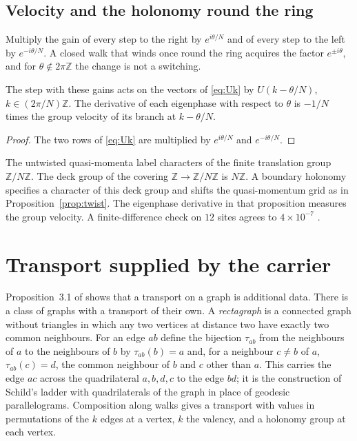 \subsection{Velocity and the holonomy round the ring}
Multiply the gain of every step to the right by $e^{i\theta/N}$ and of every step to the left by $e^{-i\theta/N}$. A closed walk that winds once round the ring acquires the factor $e^{\pm i\theta}$, and for $\theta\notin2\pi\mathbb{Z}$ the change is not a switching.

\begin{proposition}\label{prop:twist}
The step with these gains acts on the vectors of \eqref{eq:Uk} by $U(k-\theta/N)$, $k\in(2\pi/N)\mathbb{Z}$. The derivative of each eigenphase with respect to $\theta$ is $-1/N$ times the group velocity of its branch at $k-\theta/N$.
\end{proposition}
\begin{proof}
The two rows of \eqref{eq:Uk} are multiplied by $e^{i\theta/N}$ and $e^{-i\theta/N}$.
\end{proof}
The untwisted quasi-momenta label characters of the finite translation group $\mathbb{Z}/N\mathbb{Z}$. The deck group of the covering $\mathbb{Z}\to\mathbb{Z}/N\mathbb{Z}$ is $N\mathbb{Z}$. A boundary holonomy specifies a character of this deck group and shifts the quasi-momentum grid as in Proposition~\ref{prop:twist}. The eigenphase derivative in that proposition measures the group velocity. A finite-difference check on $12$ sites agrees to $4\times10^{-7}$ \cite{comp3}.

\section{Transport supplied by the carrier}\label{sec:ladder}

Proposition~3.1 of \cite{g7} shows that a transport on a graph is additional data. There is a class of graphs with a transport of their own. A \emph{rectagraph} is a connected graph without triangles in which any two vertices at distance two have exactly two common neighbours. For an edge $ab$ define the bijection $\tau_{ab}$ from the neighbours of $a$ to the neighbours of $b$ by $\tau_{ab}(b)=a$ and, for a neighbour $c\ne b$ of $a$, $\tau_{ab}(c)=d$, the common neighbour of $b$ and $c$ other than $a$. This carries the edge $ac$ across the quadrilateral $a,b,d,c$ to the edge $bd$; it is the construction of Schild's ladder with quadrilaterals of the graph in place of geodesic parallelograms. Composition along walks gives a transport with values in permutations of the $k$ edges at a vertex, $k$ the valency, and a holonomy group at each vertex.

